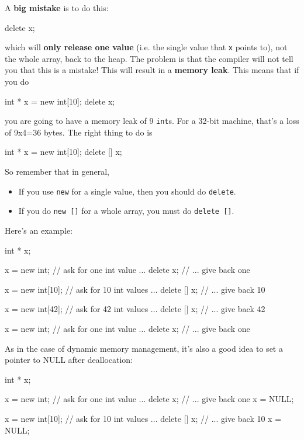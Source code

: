 A \textbf{big mistake} is to do this:

\begin{consolethree}[escapeinside=||]
delete x;
\end{consolethree}

which will \textbf{only release one value} (i.e. the single value that
\texttt{x} points to), not the whole array, back to the heap. The problem
is that the compiler will not tell you that this is a mistake! This will
result in a \textbf{memory leak}. This means that if you do

\begin{consolethree}[escapeinside=||]
int * x = new int[10];
delete x;
\end{consolethree}

you are going to have a memory leak of 9 \texttt{int}s. For a 32-bit
machine, that's a loss of 9x4=36 bytes. The right thing
to do is

\begin{consolethree}[escapeinside=||]
int * x = new int[10];
delete [] x;
\end{consolethree}

So remember that in general,

\begin{itemize}
\item If you use \texttt{new} for a single value, then you should do
  \texttt{delete}.
\item If you do \texttt{new []} for a whole array, you must do
  \texttt{delete []}.
\end{itemize}

Here's an example:

\begin{consolethree}[escapeinside=||]
int * x;

x = new int;     // ask for one int value ...
delete x;        // ... give back one

x = new int[10]; // ask for 10 int values ...
delete [] x;     // ... give back 10

x = new int[42]; // ask for 42 int values ...
delete [] x;     // ... give back 42

x = new int;     // ask for one int value ...
delete x;        // ... give back one
\end{consolethree}

As in the case of dynamic memory management, it's also a good idea to
set a pointer to NULL after deallocation:

\begin{consolethree}[escapeinside=||]
int * x;

x = new int;     // ask for one int value ...
delete x;        // ... give back one
x = NULL;

x = new int[10]; // ask for 10 int values ...
delete [] x;     // ... give back 10
x = NULL;
\end{consolethree}


